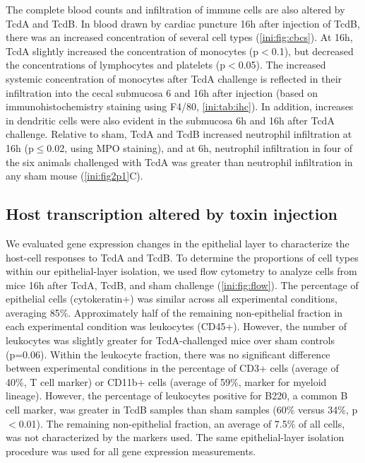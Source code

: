 The complete blood counts and infiltration of immune cells are also altered 
by TcdA and TcdB. In blood drawn by cardiac puncture 16h after injection 
of TcdB, there was an increased concentration of several cell types 
(\autoref{ini:fig:cbcs}). At 16h, TcdA slightly increased the concentration 
of monocytes (p$<$0.1), but decreased the concentrations of lymphocytes 
and platelets (p$<$0.05). The increased systemic concentration of 
monocytes after TcdA challenge is reflected in their infiltration into 
the cecal submucosa 6 and 16h after injection (based on immunohistochemistry 
staining using F4/80, \autoref{ini:tab:ihc}). In addition, increases in 
dendritic cells were also evident in the submucosa 6h and 16h after TcdA 
challenge. Relative to sham, TcdA and TcdB increased neutrophil 
infiltration at 16h (p$\leq$0.02, using MPO staining), and at 6h, 
neutrophil infiltration in four of the six animals challenged with TcdA 
was greater than neutrophil infiltration in any sham mouse (\autoref{ini:fig2p1}C).

\subsection{ Host transcription altered by toxin injection }
We evaluated gene expression changes in the epithelial layer to 
characterize the host-cell responses to TcdA and TcdB. To determine 
the proportions of cell types within our epithelial-layer isolation, 
we used flow cytometry to analyze cells from mice 16h after TcdA, TcdB, 
and sham challenge (\autoref{ini:fig:flow}). The percentage of epithelial 
cells (cytokeratin+) was similar across all experimental conditions, 
averaging 85\%. Approximately half of the remaining non-epithelial 
fraction in each experimental condition was leukocytes (CD45+). However, 
the number of leukocytes was slightly greater for TcdA-challenged mice 
over sham controls (p=0.06). Within the leukocyte fraction, there was 
no significant difference between experimental conditions in the 
percentage of CD3+ cells (average of 40\%, T cell marker) or CD11b+ 
cells (average of 59\%, marker for myeloid lineage). However, the 
percentage of leukocytes positive for B220, a common B cell marker, 
was greater in TcdB samples than sham samples (60\% versus 34\%, 
p$<$0.01). The remaining non-epithelial fraction, an average of 7.5\% 
of all cells, was not characterized by the markers used. The same 
epithelial-layer isolation procedure was used for all gene expression 
measurements.

